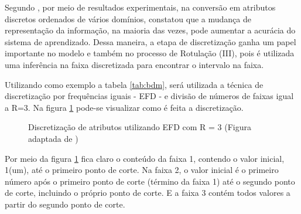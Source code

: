 Segundo \cite{Catlett2006b,Hwang2002}, por meio de resultados experimentais, na conversão em atributos discretos ordenados de vários domínios, constatou que a mudança de representação da informação, na maioria das vezes, pode aumentar a acurácia do sistema de aprendizado. Dessa maneira, a etapa de discretização ganha um papel importante no modelo e também no processo de Rotulação (III), pois é utilizada uma inferência na faixa discretizada para encontrar o intervalo na faixa. 

Utilizando como exemplo a tabela \ref{tab:bdm}, será utilizada a técnica de discretização por frequências iguais - EFD - e divisão de números de faixas igual a R=3. Na figura \ref{fig:EFD_R_3} pode-se visualizar como é feita a discretização. 

 \begin{figure}[!h]
    \centering
    
    
    
    \caption{Discretização de atributos utilizando EFD com R = 3 (Figura adaptada de \cite{Lopes2016})} \label{fig:EFD_R_3}
        
\end{figure}


Por meio da figura \ref{fig:EFD_R_3} fica claro o conteúdo da faixa 1, contendo o valor inicial, 1(um), até o primeiro ponto de corte. Na faixa 2, o valor inicial é o primeiro número após o primeiro ponto de corte (término da faixa 1) até o segundo ponto de corte, incluindo o próprio ponto de corte. E a faixa 3 contém todos valores a partir do segundo ponto de corte. 

